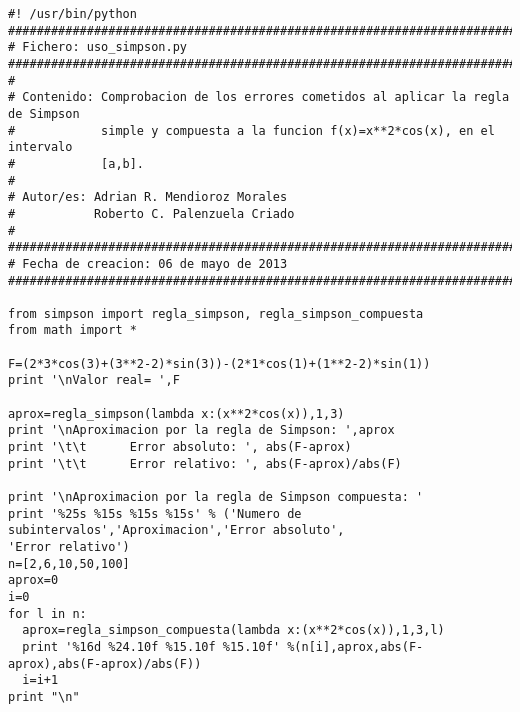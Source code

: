 \begin{center}
\begin{footnotesize}
\begin{verbatim}
#! /usr/bin/python
###################################################################################
# Fichero: uso_simpson.py
###################################################################################
#
# Contenido: Comprobacion de los errores cometidos al aplicar la regla de Simpson
#            simple y compuesta a la funcion f(x)=x**2*cos(x), en el intervalo
#            [a,b].
#
# Autor/es: Adrian R. Mendioroz Morales
#           Roberto C. Palenzuela Criado
#
###################################################################################
# Fecha de creacion: 06 de mayo de 2013 
###################################################################################

from simpson import regla_simpson, regla_simpson_compuesta
from math import *

F=(2*3*cos(3)+(3**2-2)*sin(3))-(2*1*cos(1)+(1**2-2)*sin(1))
print '\nValor real= ',F

aprox=regla_simpson(lambda x:(x**2*cos(x)),1,3)
print '\nAproximacion por la regla de Simpson: ',aprox
print '\t\t      Error absoluto: ', abs(F-aprox)
print '\t\t      Error relativo: ', abs(F-aprox)/abs(F)

print '\nAproximacion por la regla de Simpson compuesta: '
print '%25s %15s %15s %15s' % ('Numero de subintervalos','Aproximacion','Error absoluto',
'Error relativo')
n=[2,6,10,50,100]
aprox=0
i=0
for l in n:
  aprox=regla_simpson_compuesta(lambda x:(x**2*cos(x)),1,3,l)
  print '%16d %24.10f %15.10f %15.10f' %(n[i],aprox,abs(F-aprox),abs(F-aprox)/abs(F))
  i=i+1
print "\n"
\end{verbatim}
\end{footnotesize}
\end{center}
